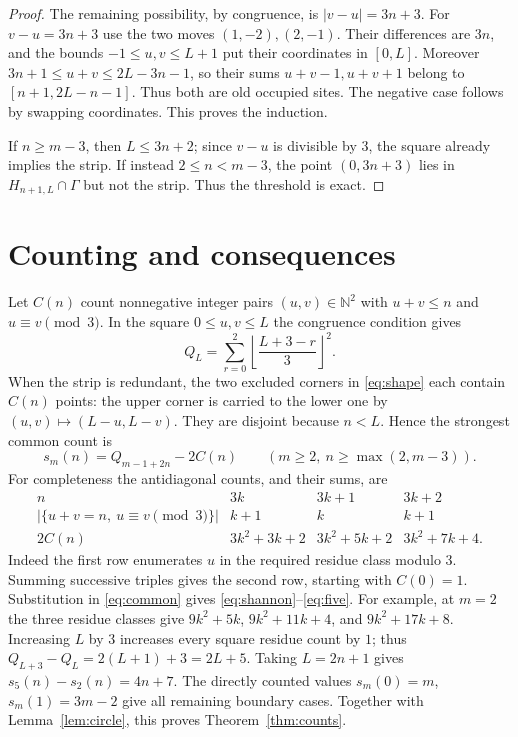 \documentclass[11pt]{article}
\newcommand{\N}{\mathbb N}
\newcommand{\card}[1]{\lvert #1\rvert}
\begin{document}
\begin{proof}
The remaining possibility, by congruence, is $|v-u|=3n+3$.
For $v-u=3n+3$ use the two moves $(1,-2),(2,-1)$. Their differences are
$3n$, and the bounds $-1\leq u,v\leq L+1$ put their coordinates in $[0,L]$.
Moreover $3n+1\leq u+v\leq2L-3n-1$, so their sums $u+v-1,u+v+1$
belong to $[n+1,2L-n-1]$. Thus both are old occupied sites.
The negative case follows by swapping coordinates. This proves the induction.

If $n\geq m-3$, then $L\leq3n+2$; since $v-u$ is divisible by $3$,
the square already implies the strip. If instead $2\leq n<m-3$,
the point $(0,3n+3)$ lies in $H_{n+1,L}\cap\Gamma$ but not the strip.
Thus the threshold is exact.
\end{proof}

\section{Counting and consequences}
Let $C(n)$ count nonnegative integer pairs $(u,v)\in\N^2$ with $u+v\leq n$ and
$u\equiv v\pmod3$. In the square $0\leq u,v\leq L$ the congruence
condition gives
\[
 Q_L=\sum_{r=0}^2\left\lfloor\frac{L+3-r}{3}\right\rfloor^2.
\]
When the strip is redundant, the two excluded corners in \eqref{eq:shape}
each contain $C(n)$ points:
the upper corner is carried to the lower one by $(u,v)\mapsto(L-u,L-v)$.
They are disjoint because $n<L$. Hence the strongest common count is
\begin{equation}\label{eq:common}
 s_m(n)=Q_{m-1+2n}-2C(n)\qquad(m\geq2,\ n\geq\max(2,m-3)).
\end{equation}
For completeness the antidiagonal counts, and their sums, are
\[
\begin{array}{c|ccc}
n&3k&3k+1&3k+2\\\hline
\card{\{u+v=n,\ u\equiv v\pmod3\}}&k+1&k&k+1\\
2C(n)&3k^2+3k+2&3k^2+5k+2&3k^2+7k+4.
\end{array}
\]
Indeed the first row enumerates $u$ in the required residue class modulo
$3$. Summing successive triples gives the second row, starting with
$C(0)=1$. Substitution in \eqref{eq:common} gives
\eqref{eq:shannon}--\eqref{eq:five}. For example, at $m=2$ the three
residue classes give $9k^2+5k$, $9k^2+11k+4$, and $9k^2+17k+8$.
Increasing $L$ by $3$ increases every square residue count by $1$;
thus $Q_{L+3}-Q_L=2(L+1)+3=2L+5$. Taking $L=2n+1$ gives
$s_5(n)-s_2(n)=4n+7$. The directly counted values
$s_m(0)=m$, $s_m(1)=3m-2$ give all remaining boundary cases.
Together with Lemma~\ref{lem:circle}, this proves Theorem~\ref{thm:counts}.
\end{document}
